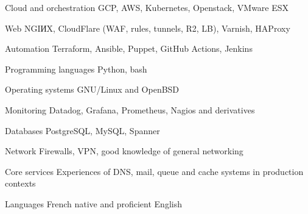 


\begin{cvskills}


\cvskill
{Cloud and orchestration} %
{GCP, AWS, Kubernetes, Openstack, VMware ESX} %


\cvskill
{Web} %
{NGIИX, CloudFlare (WAF, rules, tunnels, R2, LB), Varnish, HAProxy} %


\cvskill
{Automation} %
{Terraform, Ansible, Puppet, GitHub Actions, Jenkins} %


\cvskill
{Programming languages} %
{Python, bash} %


\cvskill
{Operating systems} %
{GNU/Linux and OpenBSD} %


\cvskill
{Monitoring} %
{Datadog, Grafana, Prometheus, Nagios and derivatives} %


\cvskill
{Databases} %
{PostgreSQL, MySQL, Spanner} %


\cvskill
{Network} %
{Firewalls, VPN, good knowledge of general networking} %


\cvskill
{Core services} %
{Experiences of DNS, mail, queue and cache systems in production contexts} %

\cvskill
{Languages} %
{French native and proficient English} %


\end{cvskills}
